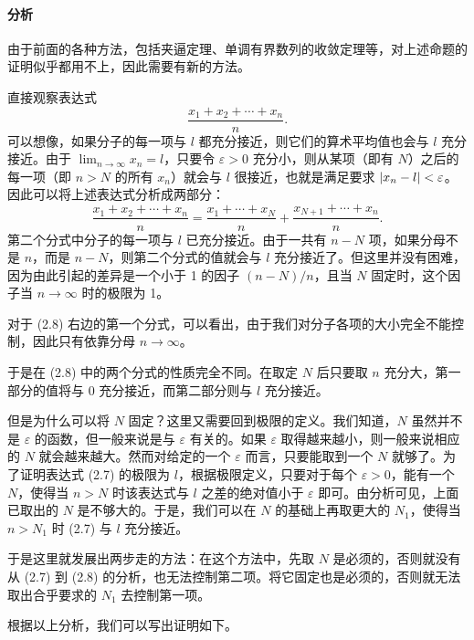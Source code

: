 \paragraph{分析}
由于前面的各种方法，包括夹逼定理、单调有界数列的收敛定理等，对上述命题的证明似乎都用不上，因此需要有新的方法。

直接观察表达式
\begin{equation}
  \frac{x_1+x_2+\cdots+x_n}{n}.
  \tag{2.7}
  \label{eq:2.7}
\end{equation}
可以想像，如果分子的每一项与 $l$ 都充分接近，则它们的算术平均值也会与 $l$ 充分接近。由于 $\displaystyle\lim_{n\to\infty}x_n=l$，只要令 $\varepsilon>0$ 充分小，则从某项（即有 $N$）之后的每一项（即 $n>N$ 的所有 $x_n$）就会与 $l$ 很接近，也就是满足要求 $\lvert x_n-l\rvert<\varepsilon$。因此可以将上述表达式分析成两部分：
\begin{equation}
  \frac{x_1+x_2+\cdots+x_n}{n}
  =\frac{x_1+\cdots+x_N}{n}+\frac{x_{N+1}+\cdots+x_n}{n}.
  \tag{2.8}
  \label{eq:2.8}
\end{equation}
第二个分式中分子的每一项与 $l$ 已充分接近。由于一共有 $n-N$ 项，如果分母不是 $n$，而是 $n-N$，则第二个分式的值就会与 $l$ 充分接近了。但这里并没有困难，因为由此引起的差异是一个小于 1 的因子 $(n-N)/n$，且当 $N$ 固定时，这个因子当 $n\to\infty$ 时的极限为 1。

对于 (2.8) 右边的第一个分式，可以看出，由于我们对分子各项的大小完全不能控制，因此只有依靠分母 $n\to\infty$。

于是在 (2.8) 中的两个分式的性质完全不同。在取定 $N$ 后只要取 $n$ 充分大，第一部分的值将与 0 充分接近，而第二部分则与 $l$ 充分接近。

但是为什么可以将 $N$ 固定？这里又需要回到极限的定义。我们知道，$N$ 虽然并不是 $\varepsilon$ 的函数，但一般来说是与 $\varepsilon$ 有关的。如果 $\varepsilon$ 取得越来越小，则一般来说相应的 $N$ 就会越来越大。然而对给定的一个 $\varepsilon$ 而言，只要能取到一个 $N$ 就够了。为了证明表达式 (2.7) 的极限为 $l$，根据极限定义，只要对于每个 $\varepsilon>0$，能有一个 $N$，使得当 $n>N$ 时该表达式与 $l$ 之差的绝对值小于 $\varepsilon$ 即可。由分析可见，上面已取出的 $N$ 是不够大的。于是，我们可以在 $N$ 的基础上再取更大的 $N_1$，使得当 $n>N_1$ 时 (2.7) 与 $l$ 充分接近。

于是这里就发展出两步走的方法：在这个方法中，先取 $N$ 是必须的，否则就没有从 (2.7) 到 (2.8) 的分析，也无法控制第二项。将它固定也是必须的，否则就无法取出合乎要求的 $N_1$ 去控制第一项。

根据以上分析，我们可以写出证明如下。

